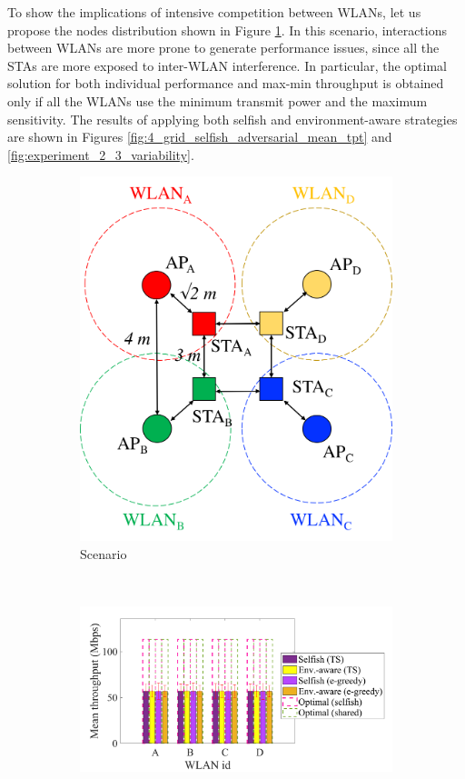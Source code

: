 \documentclass{article}
\begin{document}
To show the implications of intensive competition between WLANs, let us propose the nodes distribution shown in Figure \ref{fig:adversarial_issues_scenario}. In this scenario, interactions between WLANs are more prone to generate performance issues, since all the STAs are more exposed to inter-WLAN interference. In particular, the optimal solution for both individual performance and max-min throughput is obtained only if all the WLANs use the minimum transmit power and the maximum sensitivity. The results of applying both selfish and environment-aware strategies are shown in Figures \ref{fig:4_grid_selfish_adversarial_mean_tpt} and \ref{fig:experiment_2_3_variability}. 
\begin{figure}[h!!!!]
	\centering
	\begin{subfigure}[b]{0.3\textwidth}
		\includegraphics[width=\textwidth]{s6_new}
		\caption{Scenario}
		\label{fig:adversarial_issues_scenario}
	\end{subfigure}\\
	\begin{subfigure}[b]{0.48\textwidth}
		\includegraphics[width=\textwidth]{fig_2_3_adversarial}

\end{subfigure}
\end{figure}
\end{document}
